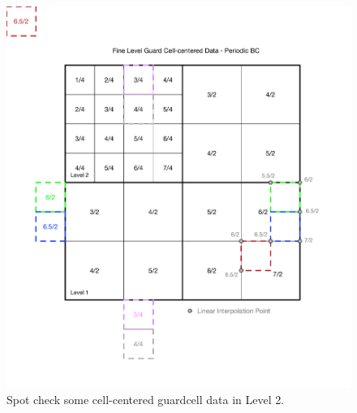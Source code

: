 \documentclass[12pt,letterpaper]{article}
\begin{document}
\newpage
\begin{figure}[!hp]
\begin{center}
\includegraphics[width=6.5in]{TestGcFill_FineGC.pdf}
\caption{Spot check some cell-centered guardcell data in Level 2.}
\end{center}
\end{figure}
\end{document}
